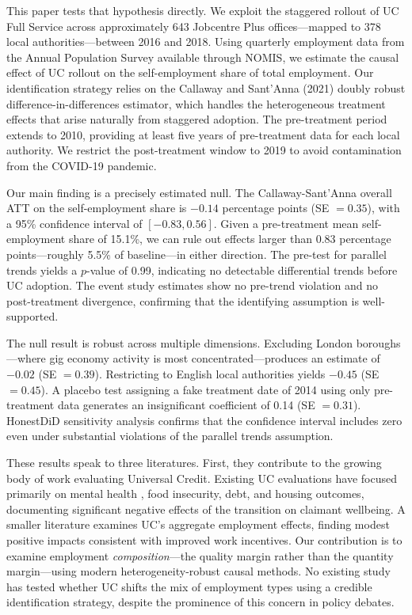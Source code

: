 \documentclass[12pt]{article}
\begin{document}
This paper tests that hypothesis directly. We exploit the staggered rollout of UC Full Service across approximately 643 Jobcentre Plus offices---mapped to 378 local authorities---between 2016 and 2018. Using quarterly employment data from the Annual Population Survey available through NOMIS, we estimate the causal effect of UC rollout on the self-employment share of total employment. Our identification strategy relies on the Callaway and Sant'Anna (2021) doubly robust difference-in-differences estimator, which handles the heterogeneous treatment effects that arise naturally from staggered adoption. The pre-treatment period extends to 2010, providing at least five years of pre-treatment data for each local authority. We restrict the post-treatment window to 2019 to avoid contamination from the COVID-19 pandemic.

Our main finding is a precisely estimated null. The Callaway-Sant'Anna overall ATT on the self-employment share is $-0.14$ percentage points (SE $= 0.35$), with a 95\% confidence interval of $[-0.83, 0.56]$. Given a pre-treatment mean self-employment share of 15.1\%, we can rule out effects larger than 0.83 percentage points---roughly 5.5\% of baseline---in either direction. The pre-test for parallel trends yields a $p$-value of 0.99, indicating no detectable differential trends before UC adoption. The event study estimates show no pre-trend violation and no post-treatment divergence, confirming that the identifying assumption is well-supported.

The null result is robust across multiple dimensions. Excluding London boroughs---where gig economy activity is most concentrated---produces an estimate of $-0.02$ (SE $= 0.39$). Restricting to English local authorities yields $-0.45$ (SE $= 0.45$). A placebo test assigning a fake treatment date of 2014 using only pre-treatment data generates an insignificant coefficient of 0.14 (SE $= 0.31$). HonestDiD sensitivity analysis confirms that the confidence interval includes zero even under substantial violations of the parallel trends assumption.

These results speak to three literatures. First, they contribute to the growing body of work evaluating Universal Credit. Existing UC evaluations have focused primarily on mental health \citep{brewerUniversalCreditWelfare2024}, food insecurity, debt, and housing outcomes, documenting significant negative effects of the transition on claimant wellbeing. A smaller literature examines UC's aggregate employment effects, finding modest positive impacts consistent with improved work incentives. Our contribution is to examine employment \textit{composition}---the quality margin rather than the quantity margin---using modern heterogeneity-robust causal methods. No existing study has tested whether UC shifts the mix of employment types using a credible identification strategy, despite the prominence of this concern in policy debates.
\end{document}
